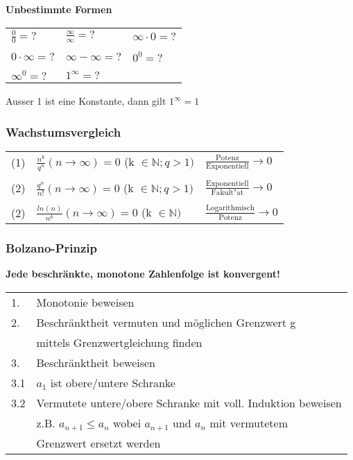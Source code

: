     \textbf{Unbestimmte Formen} \\
        \begin{tabular}{lll}
            $\frac{0}{0} = ?$    & $\frac{\infty}{\infty} = ?$ & $\infty \cdot 0 = ?$ \\
            \\
            $0 \cdot \infty = ?$ & $\infty - \infty = ?$       & $0^0 = ?$ \\
            \\
            $\infty^0 = ?$       & $1^{\infty} = ?$            & \\
        \end{tabular}
    
        Ausser 1 ist eine Konstante, dann gilt $1^{\infty} = 1 $ \\
        
\subsubsection{Wachstumsvergleich} 
    \begin{tabular}{lll}
        (1) & $\frac{n^k}{q^n} (n \rightarrow \infty)= 0$  (k $\in \mathbb{N}; q > 1)$ & $\frac{\text{Potenz}}{\text{Exponentiell}} \rightarrow 0$\\
        \\
        (2) & $\frac{q^n}{n!} (n \rightarrow \infty)= 0$  (k $\in \mathbb{N}; q > 1)$  & $\frac{\text{Exponentiell}}{\text{Fakult"at}} \rightarrow 0$ \\
        \\
        (2) & $\frac{ln(n)}{n^k} (n \rightarrow \infty)= 0$  (k $\in \mathbb{N})$      & $\frac{\text{Logarithmisch}}{\text{Potenz}} \rightarrow 0$ \\
    \end{tabular}						
        
\subsubsection{Bolzano-Prinzip}
    \textbf{Jede beschränkte, monotone Zahlenfolge ist konvergent!} \\
        \begin{tabular}{ll}
            1. & Monotonie beweisen \\
            2. &  Beschränktheit vermuten und möglichen Grenzwert g \\ 
               & mittels Grenzwertgleichung finden  \\
            3. & Beschränktheit beweisen \\
            3.1 & $a_1$ ist obere/untere Schranke \\
            3.2 & Vermutete untere/obere Schranke mit voll. Induktion beweisen \\
                & z.B. $a_{n+1} \leq a_n$ wobei $a_{n+1}$ und $a_n$ mit vermutetem \\
                & Grenzwert ersetzt werden \\
        \end{tabular}
    
